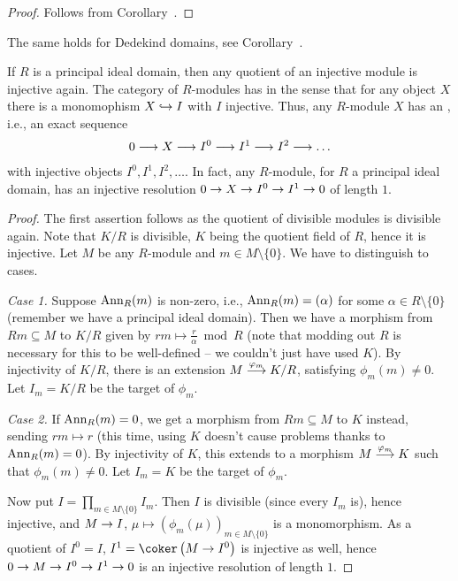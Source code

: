 \documentclass[a4paper,parskip=half,numbers=enddot, DIV=12]{scrreprt}
\begin{document}
\begin{proof}
	Follows from Corollary~.
\end{proof}
\begin{rem*}
	The same holds for Dedekind domains, see Corollary~.
\end{rem*}
\begin{cor}
	If $R$ is a principal ideal domain, then any quotient of an injective module is injective again. The category of $R$-modules has  in the sense that for any object $X$ there is a monomophism $X\monomorphism I$ with $I$ injective. Thus, any $R$-module $X$ has an , i.e., an exact sequence
	\begin{align*}
	0\morphism X\morphism I^0\morphism I^1\morphism I^2\morphism\ldots
	\end{align*}
	with injective objects $I^0,I^1,I^2,\ldots$. In fact, any $R$-module, for $R$ a principal ideal domain, has an injective resolution $0\morphism X\morphism I^0\morphism I^1\morphism 0$ of length $1$.
\end{cor}
\begin{proof}
	The first assertion follows as the quotient of divisible modules is divisible again. Note that $K/R$ is divisible, $K$ being the quotient field of $R$, hence it is injective. Let $M$ be any $R$-module and $m\in M\setminus\{0\}$. We have to distinguish to cases.
	
	\emph{Case 1.} Suppose $\operatorname{Ann}_R(m)$ is non-zero, i.e., $\operatorname{Ann}_R(m)=(\alpha)$ for some $\alpha\in R\setminus \{0\}$ (remember we have a principal ideal domain). Then we have a morphism from $Rm\subseteq M$ to $K/R$ given by $rm\mapsto \frac{r}{\alpha}\bmod R$ (note that modding out $R$ is necessary for this to be well-defined -- we couldn't just have used $K$). By injectivity of $K/R$, there is an extension $M\morphism[\phi_m]K/R$, satisfying $\phi_m(m)\neq 0$. Let $I_m= K/R$ be the target of $\phi_m$.
	
	\emph{Case 2.} If $\operatorname{Ann}_R(m)=0$, we get a morphism from $Rm\subseteq M$ to $K$ instead, sending $rm\mapsto r$ (this time, using $K$ doesn't cause problems thanks to $\operatorname{Ann}_R(m)=0$). By injectivity of $K$, this extends to a morphism $M\morphism[\phi_m]K$ such that $\phi_m(m)\neq0$. Let $I_m=K$ be the target of $\phi_m$.
	
	Now put $I=\prod_{m\in M\setminus\{0\}}I_m$. Then $I$ is divisible (since every $I_m$ is), hence injective, and $M\morphism I$, $\mu\mapsto\left(\phi_m(\mu)\right)_{m\in M\setminus\{0\}}$ is a monomorphism. As a quotient of $I^0=I$, $I^1=\coker\left(M\morphism I^0\right)$ is injective as well, hence $0\morphism M\morphism I^0\morphism I^1\morphism 0$ is an injective resolution of length $1$.
\end{proof}
\end{document}
